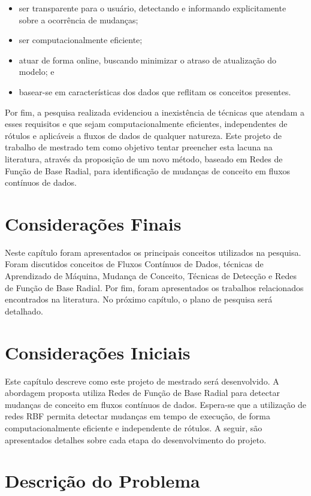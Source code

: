 \documentclass[msc, classic, a4paper]{ufbathesis}
\begin{document}
\begin{itemize}
    \item ser transparente para o usuário, detectando e informando explicitamente sobre a ocorrência de mudanças;
    \item ser computacionalmente eficiente;
    \item atuar de forma online, buscando minimizar o atraso de atualização do modelo; e
    \item basear-se em características dos dados que reflitam os conceitos presentes.
\end{itemize}

Por fim, a pesquisa realizada evidenciou a inexistência de técnicas que atendam a esses requisitos e que sejam computacionalmente eficientes, independentes de rótulos e aplicáveis a fluxos de dados de qualquer natureza. Este projeto de trabalho de mestrado tem como objetivo tentar preencher esta lacuna na literatura, através da proposição de um novo método, baseado em Redes de Função de Base Radial,  para identificação de mudanças de conceito em fluxos contínuos de dados.

\section{Considerações Finais}

Neste capítulo foram apresentados os principais conceitos utilizados na pesquisa.
Foram discutidos conceitos de Fluxos Contínuos de Dados,
técnicas de Aprendizado de Máquina,
Mudança de Conceito,
Técnicas de Detecção e Redes de Função de Base Radial.
Por fim, foram apresentados os trabalhos relacionados encontrados na literatura.
No próximo capítulo, o plano de pesquisa será detalhado.

 \label{plano_pesquisa}
\section{Considerações Iniciais}

Este capítulo descreve como este projeto de mestrado será desenvolvido.
A abordagem proposta utiliza Redes de Função de Base Radial para detectar mudanças de conceito em fluxos contínuos de dados.
Espera-se que a utilização de redes RBF permita detectar mudanças em tempo de execução, de forma computacionalmente eficiente e independente de rótulos.
A seguir, são apresentados detalhes sobre cada etapa do desenvolvimento do projeto.

\section{Descrição do Problema}
\end{document}
